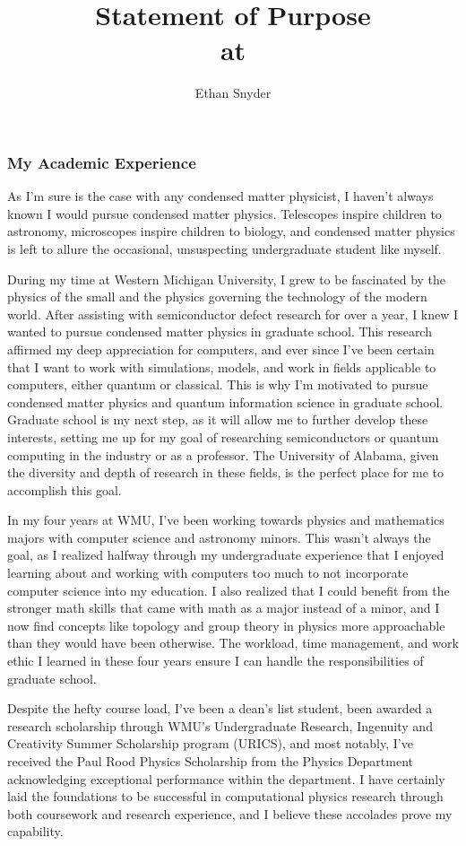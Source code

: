 \documentclass[11pt]{article}
\title{\vspace{-5em}Statement of Purpose\\
	\large \dept{} at \school{}}
\author{Ethan Snyder}
\date{}
\newcommand{\school}{University of Alabama}
\begin{document}
\maketitle
\subsubsection*{My Academic Experience}
As I'm sure is the case with any condensed matter physicist, I haven't always known I would pursue condensed matter physics. Telescopes inspire children to astronomy, microscopes inspire children to biology, and condensed matter physics is left to allure the occasional, unsuspecting undergraduate student like myself.

During my time at Western Michigan University, I grew to be fascinated by the physics of the small and the physics governing the technology of the modern world. After assisting with semiconductor defect research for over a year, I knew I wanted to pursue condensed matter physics in graduate school. This research affirmed my deep appreciation for computers, and ever since I've been certain that I want to work with simulations, models, and work in fields applicable to computers, either quantum or classical. This is why I'm motivated to pursue condensed matter physics and quantum information science in graduate school. Graduate school is my next step, as it will allow me to further develop these interests, setting me up for my goal of researching semiconductors or quantum computing in the industry or as a professor. The \school{}, given the diversity and depth of research in these fields, is the perfect place for me to accomplish this goal.

In my four years at WMU, I've been working towards physics and mathematics majors with computer science and astronomy minors. This wasn't always the goal, as I realized halfway through my undergraduate experience that I enjoyed learning about and working with computers too much to not incorporate computer science into my education. I also realized that I could benefit from the stronger math skills that came with math as a major instead of a minor, and I now find concepts like topology and group theory in physics more approachable than they would have been otherwise. The workload, time management, and work ethic I learned in these four years ensure I can handle the responsibilities of graduate school.

Despite the hefty course load, I've been a dean's list student, been awarded a research scholarship through WMU's Undergraduate Research, Ingenuity and Creativity Summer Scholarship program (URICS), and most notably, I've received the Paul Rood Physics Scholarship from the Physics Department acknowledging exceptional performance within the department. I have certainly laid the foundations to be successful in computational physics research through both coursework and research experience, and I believe these accolades prove my capability.
\end{document}
